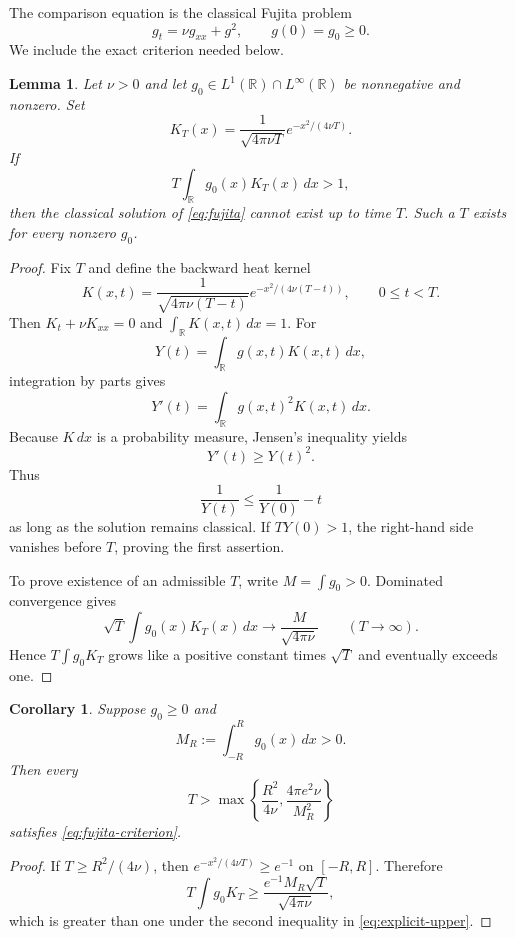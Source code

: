 \documentclass[11pt]{article}
\newtheorem{lemma}[theorem]{Lemma}
\newtheorem{corollary}[theorem]{Corollary}
\theoremstyle{definition}
\newcommand{\R}{\mathbb R}
\begin{document}
The comparison equation is the classical Fujita problem
\begin{equation}\label{eq:fujita}
 g_t=\nu g_{xx}+g^2,
 \qquad g(0)=g_0\ge0.
\end{equation}
We include the exact criterion needed below.

\begin{lemma}\label{lem:fujita}
Let $\nu>0$ and let $g_0\in L^1(\R)\cap L^\infty(\R)$ be nonnegative and nonzero.  Set
\[
 K_T(x)=\frac{1}{\sqrt{4\pi\nu T}}e^{-x^2/(4\nu T)}.
\]
If
\begin{equation}\label{eq:fujita-criterion}
 T\int_\R g_0(x)K_T(x)\,dx>1,
\end{equation}
then the classical solution of \eqref{eq:fujita} cannot exist up to time $T$.  Such a $T$ exists for every nonzero $g_0$.
\end{lemma}

\begin{proof}
Fix $T$ and define the backward heat kernel
\[
 K(x,t)=\frac{1}{\sqrt{4\pi\nu(T-t)}}
 e^{-x^2/(4\nu(T-t))},
 \qquad 0\le t<T.
\]
Then $K_t+\nu K_{xx}=0$ and $\int_\R K(x,t)\,dx=1$.  For
\[
 Y(t)=\int_\R g(x,t)K(x,t)\,dx,
\]
integration by parts gives
\[
 Y'(t)=\int_\R g(x,t)^2K(x,t)\,dx.
\]
Because $K\,dx$ is a probability measure, Jensen's inequality yields
\[
 Y'(t)\ge Y(t)^2.
\]
Thus
\[
 \frac1{Y(t)}\le\frac1{Y(0)}-t
\]
as long as the solution remains classical.  If $TY(0)>1$, the right-hand side vanishes before $T$, proving the first assertion.

To prove existence of an admissible $T$, write $M=\int g_0>0$.  Dominated convergence gives
\[
 \sqrt{T}\int g_0(x)K_T(x)\,dx
 \longrightarrow\frac{M}{\sqrt{4\pi\nu}}
 \qquad(T\to\infty).
\]
Hence $T\int g_0K_T$ grows like a positive constant times $\sqrt{T}$ and eventually exceeds one.
\end{proof}

\begin{corollary}\label{cor:explicit-upper}
Suppose $g_0\ge0$ and
\[
 M_R:=\int_{-R}^R g_0(x)\,dx>0.
\]
Then every
\begin{equation}\label{eq:explicit-upper}
 T>\max\left\{\frac{R^2}{4\nu},\frac{4\pi e^2\nu}{M_R^2}\right\}
\end{equation}
satisfies \eqref{eq:fujita-criterion}.
\end{corollary}

\begin{proof}
If $T\ge R^2/(4\nu)$, then $e^{-x^2/(4\nu T)}\ge e^{-1}$ on $[-R,R]$.  Therefore
\[
 T\int g_0K_T
 \ge \frac{e^{-1}M_R\sqrt{T}}{\sqrt{4\pi\nu}},
\]
which is greater than one under the second inequality in \eqref{eq:explicit-upper}.
\end{proof}
\end{document}
